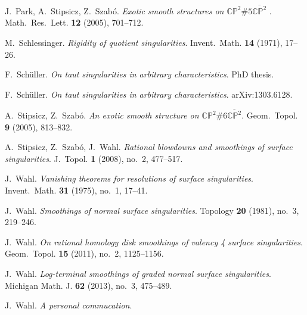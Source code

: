 \documentclass[a4paper, reqno, twoside]{amsart}
\theoremstyle{definition}
\numberwithin{equation}{section}
\begin{document}
\begin{thebibliography}{99}
 J.~Park, A.~Stipsicz, Z.~Szab\'o. \textit{Exotic  smooth structures on ${\mathbb {CP}}^2 \# 5 {\overline {{\mathbb {CP}}^2}}$ }. Math.~Res.~Lett. \textbf{12} (2005), 701--712.

 M.~Schlessinger. \textit{Rigidity of quotient singularities}. Invent.~Math. \textbf{14} (1971), 17--26.

 F.~Sch\"uller. \textit{On taut singularities in arbitrary characteristics}. PhD thesis.

 F.~Sch\"uller. \textit{On taut singularities
  in arbitrary characteristics}. arXiv:1303.6128.

 A.~Stipsicz, Z.~Szab\'o. \textit{An exotic smooth
  structure on  ${\mathbb {CP}}^2 \# 6 {\overline {{\mathbb {CP}}^2}}$}.
Geom.~Topol. \textbf{9} (2005), 813--832.

 A.~Stipsicz, Z.~Szab\'o, J.~Wahl. \textit{Rational blowdowns and smoothings of surface singularities}. J.~Topol. \textbf{1} (2008), no.~2, 477--517.

 J.~Wahl. \textit{Vanishing theorems for resolutions of surface singularities}. Invent.~Math. \textbf{31} (1975), no.~1, 17--41.

 J.~Wahl. \textit{Smoothings of normal surface singularities}. Topology \textbf{20} (1981), no.~3, 219--246.

 J.~Wahl. \textit{On rational homology disk smoothings of valency 4 surface singularities}. Geom.~Topol. \textbf{15} (2011),  no.~2, 1125--1156.

 J.~Wahl. \textit{Log-terminal smoothings of graded normal surface singularities}. Michigan Math. J. \textbf{62} (2013), no.~3, 475--489.

 J.~Wahl. \textit{A personal commucation}.
\end{thebibliography}
\end{document}
